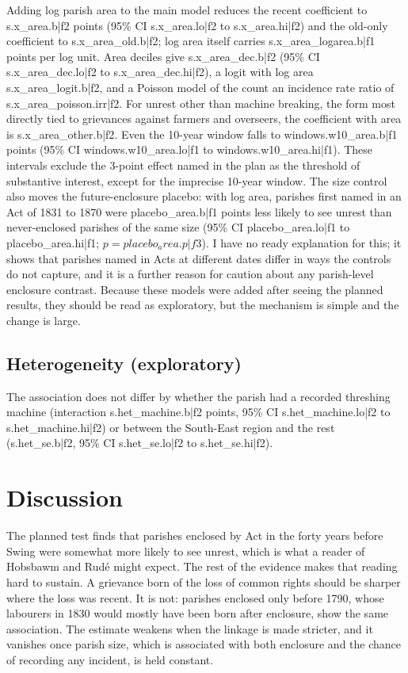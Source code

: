 \documentclass[11pt,a4paper]{article}
\begin{document}
Adding log parish area to the main model reduces the recent coefficient to {{s.x_area.b|f2}} points (95\% CI {{s.x_area.lo|f2}} to {{s.x_area.hi|f2}}) and the old-only coefficient to {{s.x_area_old.b|f2}}; log area itself carries {{s.x_area_logarea.b|f1}} points per log unit. Area deciles give {{s.x_area_dec.b|f2}} (95\% CI {{s.x_area_dec.lo|f2}} to {{s.x_area_dec.hi|f2}}), a logit with log area {{s.x_area_logit.b|f2}}, and a Poisson model of the count an incidence rate ratio of {{s.x_area_poisson.irr|f2}}. For unrest other than machine breaking, the form most directly tied to grievances against farmers and overseers, the coefficient with area is {{s.x_area_other.b|f2}}. Even the 10-year window falls to {{windows.w10_area.b|f1}} points (95\% CI {{windows.w10_area.lo|f1}} to {{windows.w10_area.hi|f1}}). These intervals exclude the 3-point effect named in the plan as the threshold of substantive interest, except for the imprecise 10-year window. The size control also moves the future-enclosure placebo: with log area, parishes first named in an Act of 1831 to 1870 were {{placebo_area.b|f1}} points less likely to see unrest than never-enclosed parishes of the same size (95\% CI {{placebo_area.lo|f1}} to {{placebo_area.hi|f1}}; $p={{placebo_area.p|f3}}$). I have no ready explanation for this; it shows that parishes named in Acts at different dates differ in ways the controls do not capture, and it is a further reason for caution about any parish-level enclosure contrast. Because these models were added after seeing the planned results, they should be read as exploratory, but the mechanism is simple and the change is large.

\subsection{Heterogeneity (exploratory)}
The association does not differ by whether the parish had a recorded threshing machine (interaction {{s.het_machine.b|f2}} points, 95\% CI {{s.het_machine.lo|f2}} to {{s.het_machine.hi|f2}}) or between the South-East region and the rest ({{s.het_se.b|f2}}, 95\% CI {{s.het_se.lo|f2}} to {{s.het_se.hi|f2}}).

\section{Discussion}
The planned test finds that parishes enclosed by Act in the forty years before Swing were somewhat more likely to see unrest, which is what a reader of Hobsbawm and Rud\'e might expect. The rest of the evidence makes that reading hard to sustain. A grievance born of the loss of common rights should be sharper where the loss was recent. It is not: parishes enclosed only before 1790, whose labourers in 1830 would mostly have been born after enclosure, show the same association. The estimate weakens when the linkage is made stricter, and it vanishes once parish size, which is associated with both enclosure and the chance of recording any incident, is held constant.
\end{document}
